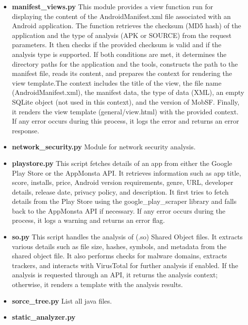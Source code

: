 \documentclass{report}
\begin{document}
\begin{itemize}
\begin{itemize}
\begin{itemize}
                    \item \textbf{manifest\_views.py}
                    This module provides a view function run for displaying the content of the AndroidManifest.xml file associated with an Android application. The function retrieves the checksum (MD5 hash) of the application and the type of analysis (APK or SOURCE) from the request parameters. It then checks if the provided checksum is valid and if the analysis type is supported. If both conditions are met, it determines the directory paths for the application and the tools, constructs the path to the manifest file, reads its content, and prepares the context for rendering the view template.The context includes the title of the view, the file name (AndroidManifest.xml), the manifest data, the type of data (XML), an empty SQLite object (not used in this context), and the version of MobSF. Finally, it renders the view template (general/view.html) with the provided context. If any error occurs during this process, it logs the error and returns an error response.
                    \item \textbf{network\_security.py}
                    Module for network security analysis.
                    \item \textbf{playstore.py}
                    This script fetches details of an app from either the Google Play Store or the AppMonsta API. It retrieves information such as app title, score, installs, price, Android version requirements, genre, URL, developer details, release date, privacy policy, and description. It first tries to fetch details from the Play Store using the google\_play\_scraper library and falls back to the AppMonsta API if necessary. If any error occurs during the process, it logs a warning and returns an error flag.
                    \item \textbf{so.py}                    
                    This script handles the analysis of (.so) Shared Object files. It extracts various details such as file size, hashes, symbols, and metadata from the shared object file. It also performs checks for malware domains, extracts trackers, and interacts with VirusTotal for further analysis if enabled. If the analysis is requested through an API, it returns the analysis context; otherwise, it renders a template with the analysis results.
                    \item \textbf{sorce\_tree.py}
                    List all java files.
                    \item \textbf{static\_analyzer.py}

\end{itemize}
\end{itemize}
\end{itemize}
\end{document}
